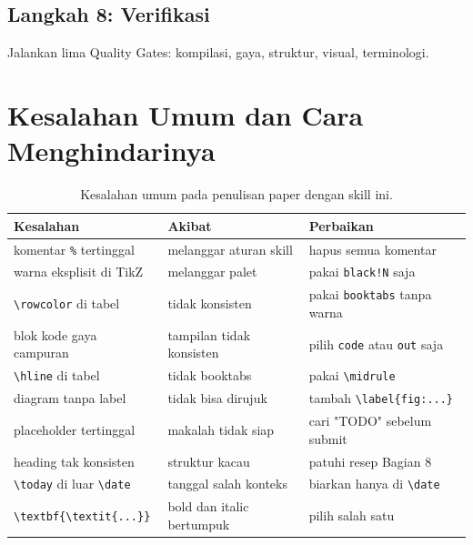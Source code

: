 \documentclass[11pt,a4paper]{article}
\begin{document}
\subsection{Langkah 8: Verifikasi}

Jalankan lima Quality Gates: kompilasi, gaya, struktur, visual, terminologi.

\section{Kesalahan Umum dan Cara Menghindarinya}

\begin{table}[H]
	\centering
	\caption{Kesalahan umum pada penulisan paper dengan skill ini.}
	\label{tab:mistakes}
	\footnotesize
	\begin{tabularx}{\textwidth}{l X X}
		\toprule
		Kesalahan                                                          & Akibat                    & Perbaikan                                       \\
		\midrule
		komentar \texttt{\%} tertinggal                                    & melanggar aturan skill    & hapus semua komentar                            \\
		warna eksplisit di TikZ                                            & melanggar palet           & pakai \texttt{black!N} saja                     \\
		\texttt{\textbackslash rowcolor} di tabel                          & tidak konsisten           & pakai \texttt{booktabs} tanpa warna             \\
		blok kode gaya campuran                                            & tampilan tidak konsisten  & pilih \texttt{code} atau \texttt{out} saja      \\
		\texttt{\textbackslash hline} di tabel                             & tidak booktabs            & pakai \texttt{\textbackslash midrule}           \\
		diagram tanpa label                                                & tidak bisa dirujuk        & tambah \texttt{\textbackslash label\{fig:...\}} \\
		placeholder tertinggal                                             & makalah tidak siap        & cari "TODO" sebelum submit                      \\
		heading tak konsisten                                              & struktur kacau            & patuhi resep Bagian 8                           \\
		\texttt{\textbackslash today} di luar \texttt{\textbackslash date} & tanggal salah konteks     & biarkan hanya di \texttt{\textbackslash date}   \\
		\texttt{\textbackslash textbf\{\textbackslash textit\{...\}\}}     & bold dan italic bertumpuk & pilih salah satu                                \\
		\bottomrule
	\end{tabularx}
\end{table}
\end{document}
